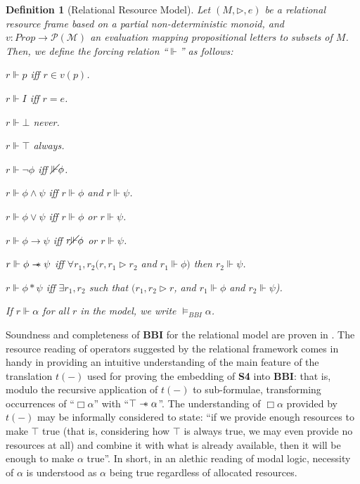 \documentclass[a4paper]{article}
\newtheorem{definition}[theorem]{Definition}
\newcommand\magicwand{\mathrel{-\mkern-6mu*}}
\newcommand{\BBI}{\textbf{BBI}\xspace}
\newcommand{\SFour}{\textbf{S4}\xspace}
\begin{document}
\begin{definition}[Relational Resource Model] Let $(M, \triangleright, e)$ be a relational resource frame based on a partial non-deterministic monoid, and $v:Prop \longrightarrow \mathcal{P(M)}$ an evaluation mapping propositional letters to subsets of $M$. Then, we define the forcing relation ``$\Vdash$'' as follows:

    \begin{description}
        \item $r \Vdash p$ iff $r \in v(p)$.
        \item $r \Vdash I$ iff $r=e$.
        \item $r \Vdash \bot$ never.
        \item $r \Vdash \top$ always.
        \item $r \Vdash \neg \phi$ iff $\cancel\Vdash \phi$.
        \item $r \Vdash \phi \land \psi$ iff $r \Vdash \phi$ and $r \Vdash \psi$.
        \item $r \Vdash \phi \lor \psi$ iff $r \Vdash \phi$ or $r \Vdash \psi$.
        \item $r \Vdash \phi \rightarrow \psi$ iff $r \cancel\Vdash \phi$ or $r \Vdash \psi$.
        \item $r \Vdash \phi \magicwand \psi$ iff $\forall r_1,r_2 (r,r_1 \triangleright r_2$ and $r_1 \Vdash \phi)$ then $r_2 \Vdash \psi$.
        \item $r \Vdash \phi * \psi$ iff $\exists r_1,r_2 $ such that $ (r_1,r_2 \triangleright r$, and $r_1 \Vdash \phi$ and $r_2 \Vdash \psi$).






    \end{description}

If $r \Vdash \alpha$ for all $r$ in the model, we write $\vDash_{BBI}\alpha$.
    
\end{definition}

Soundness and completeness of \BBI for the relational model are proven in \cite{galmiche_expressivity_2006}. The resource reading of operators suggested by the relational framework comes in handy in providing an intuitive understanding of the main feature of the translation $t(-)$ used for proving the embedding of \SFour into \BBI: that is, modulo the recursive application of $t(-)$ to sub-formulae, transforming occurrences of ``$\Box \alpha$'' with ``$\top \magicwand \alpha$''. The understanding of $\Box \alpha$ provided by $t(-)$ may be informally considered to state: ``if we provide enough resources to make $\top$ true (that is, considering how $\top$ is always true, we may even provide no resources at all) and combine it with what is already available, then it will be enough to make $\alpha$ true''. In short, in an alethic reading of modal logic, necessity of $\alpha$ is understood as $\alpha$ being true regardless of allocated resources.
\end{document}
